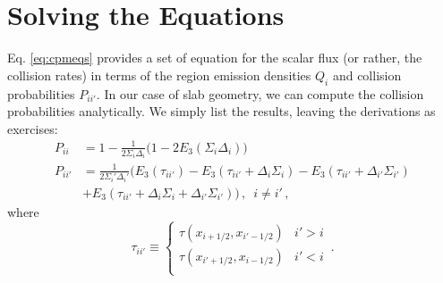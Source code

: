 \section*{Solving the Equations}
Eq. \ref{eq:cpmeqs} provides a set of equation for the scalar flux (or rather, the collision rates) in terms of the region emission densities $Q_i$ and collision probabilities $P_{ii'}$.  In our case of slab geometry, we can compute the collision probabilities analytically.  We simply list the results, leaving the derivations as exercises:
\begin{equation}
\begin{split}
 P_{ii}  &= 1 - \frac{1}{2\Sigma_i \Delta_i} \Big ( 1-2E_3(\Sigma_i \Delta_i) \Big ) \\
 P_{ii'} &= \frac{1}{2\Sigma_i' \Delta_i'} \Big ( E_3(\tau_{ii'}) - E_3(\tau_{ii'}+\Delta_i \Sigma_i) - E_3( \tau_{ii'} + \Delta_{i'} \Sigma_{i'}) \\
         &+ E_3(\tau_{ii'} + \Delta_i \Sigma_i + \Delta_{i'} \Sigma_{i'} ) \Big ) \, , \,\,\, i \neq i' \, ,
\end{split}
\end{equation}
where
\begin{equation}
 \tau_{ii'} \equiv \begin{cases} \tau( x_{i+1/2}, x_{i'-1/2} )   &   i' > i  \\
                            \tau( x_{i'+1/2}, x_{i-1/2} )   &   i' < i  \\
 \end{cases} \, .
\end{equation}


